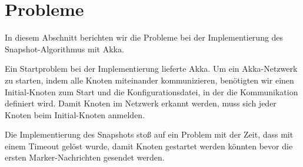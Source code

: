 \section{Probleme}
\label{sec:probs}
In diesem Abschnitt berichten wir die Probleme bei der Implementierung des
Snapshot-Algorithmus mit Akka.

Ein Startproblem bei der Implementierung lieferte Akka.
Um ein Akka-Netzwerk zu starten, indem alle Knoten miteinander kommunizieren,
benötigten wir einen Initial-Knoten zum Start und die Konfigurationsdatei, in
der die Kommunikation definiert wird.
Damit Knoten im Netzwerk erkannt werden, muss sich jeder Knoten beim
Initial-Knoten anmelden.

Die Implementierung des Snapshots stoß auf ein Problem mit der Zeit, dass 
mit einem Timeout gelöst wurde, damit Knoten gestartet werden könnten bevor
die ersten Marker-Nachrichten gesendet werden.
